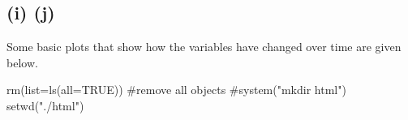 \documentclass{article}
\begin{document}


\subsection*{(i) (j)}

Some basic plots that show how the variables have changed over time are given below.

rm(list=ls(all=TRUE)) #remove all objects
#system("mkdir html")
setwd("./html")
\end{document}
